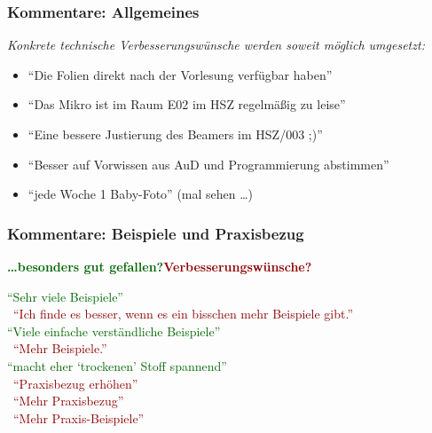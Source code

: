 \documentclass[onlymath]{beamer}
\begin{document}
\maketitle

% 
% 


\newcommand{\praise}[1]{\textcolor{darkgreen}{"`#1"'}}
\newcommand{\critique}[1]{~\hfill\textcolor{darkred}{"`#1"'}}

\begin{frame}\frametitle{Kommentare: Allgemeines}

\bigskip

\emph{Konkrete technische Verbesserungswünsche werden soweit möglich umgesetzt:}
\begin{itemize}
\item "`Die Folien direkt nach der Vorlesung verfügbar haben"'
\item "`Das Mikro ist im Raum E02 im HSZ regelmäßig zu leise"'
\item "`Eine bessere Justierung des Beamers im HSZ/003 ;)"'
\item "`Besser auf Vorwissen aus AuD und Programmierung abstimmen"'
\item "`jede Woche 1 Baby-Foto"' (mal sehen \ldots)
\end{itemize}

\end{frame}

\begin{frame}\frametitle{Kommentare: Beispiele und Praxisbezug}

\textbf{\textcolor{darkgreen}{\ldots besonders gut gefallen?}}\hfill\textbf{\textcolor{darkred}{Verbesserungswünsche?}}
\bigskip

\praise{Sehr viele Beispiele}\\[1ex]
\critique{Ich finde es besser, wenn es ein bisschen mehr Beispiele gibt.}\\[1ex]
\praise{Viele einfache verständliche Beispiele}\\[1ex]
\critique{Mehr Beispiele.}\\[3ex]
\praise{macht eher `trockenen' Stoff spannend}\\[1ex]
\critique{Praxisbezug erhöhen}\\[1ex]
\critique{Mehr Praxisbezug}\\[1ex]
\critique{Mehr Praxis-Beispiele}

\end{frame}
\end{document}
